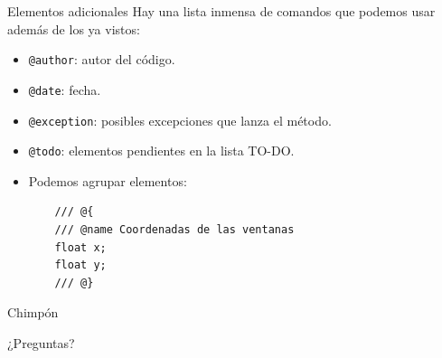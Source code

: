 \documentclass{beamer}
\begin{document}
\begin{frame}[fragile=singleslide]{Elementos adicionales}
  Hay una lista inmensa de comandos que podemos usar además de los ya vistos:

  \begin{itemize}
  \item \texttt{@author}: autor del código.
  \item \texttt{@date}: fecha.
  \item \texttt{@exception}: posibles excepciones que lanza el método.
  \item \texttt{@todo}: elementos pendientes en la lista TO-DO.
  \item Podemos agrupar elementos: 
\begin{lstlisting}
    /// @{
    /// @name Coordenadas de las ventanas
    float x;
    float y;
    /// @}

\end{lstlisting}
  \end{itemize}
  
\end{frame}

\begin{frame}{Chimpón}
  \begin{center}
{\Large
    ¿Preguntas? }
  \end{center}
\end{frame}
\end{document}
